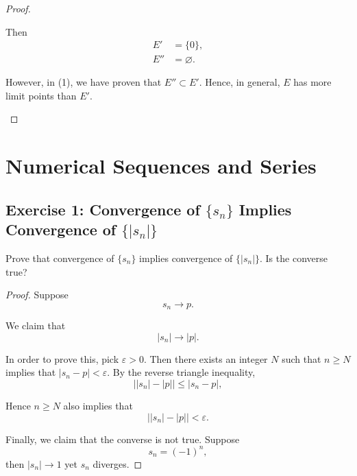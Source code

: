 \documentclass{amsbook}
\theoremstyle{definition}
\theoremstyle{remark}
\numberwithin{section}{chapter}
\numberwithin{equation}{chapter}
\begin{document}
\begin{proof}
\begin{enumerate}
Then\[
\begin{split}
E'&=\{0\},\\
E''&=\varnothing.
\end{split}
\]

However, in (1), we have proven that $E''\subset E'$. Hence, in general, $E$ has more limit points than $E'$.
\end{enumerate}
\end{proof}

\chapter{Numerical Sequences and Series}
\section{Exercise 1: Convergence of $\{s_n\}$ Implies Convergence of $\{|s_n|\}$}
Prove that convergence of $\{s_n\}$ implies convergence of $\{|s_n|\}$. Is the converse true?
\begin{proof}
Suppose\[
s_n\to p.
\]

We claim that\[
|s_n|\to |p|.
\]

In order to prove this, pick $\varepsilon>0$. Then there exists an integer $N$ such that $n\geqslant N$ implies that $|s_n-p|<\varepsilon$. By the reverse triangle inequality,\[
\left||s_n|-|p|\right|\leqslant \left|s_n-p\right|,
\]

Hence $n\geqslant N$ also implies that \[
\left||s_n|-|p|\right|<\varepsilon.
\]

Finally, we claim that the converse is not true. Suppose\[
s_n=(-1)^n,
\] then $|s_n|\to 1$ yet $s_n$ diverges.
\end{proof}
\end{document}
